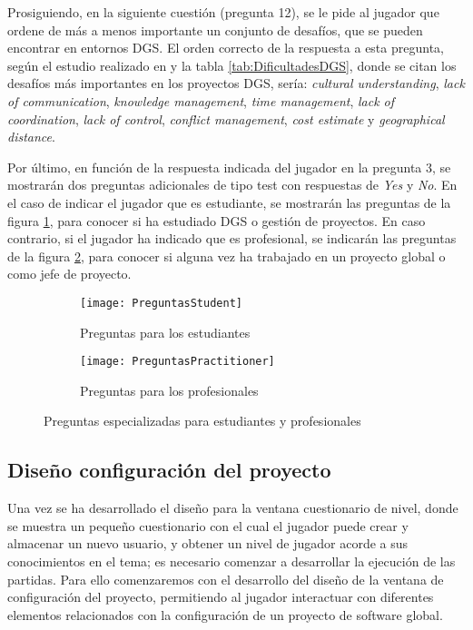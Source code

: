 Prosiguiendo, en la siguiente cuestión (pregunta 12), se le pide al jugador que ordene de más a menos importante un conjunto de desafíos, que se pueden encontrar en entornos DGS. El orden correcto de la respuesta a esta pregunta, según el estudio realizado en \cite{niazi2016challenges} y la tabla \ref{tab:DificultadesDGS}, donde se citan los desafíos más importantes en los proyectos DGS, sería: \emph{cultural understanding}, \emph{lack of communication}, \emph{knowledge management}, \emph{time management}, \emph{lack of coordination}, \emph{lack of control}, \emph{conflict management}, \emph{cost estimate} y \emph{geographical distance}.

Por último, en función de la respuesta indicada del jugador en la pregunta 3, se mostrarán dos preguntas adicionales de tipo test con respuestas de \emph{Yes} y \emph{No}. En el caso de indicar el jugador que es estudiante, se mostrarán las preguntas de la figura \ref{fig:PreguntasStudent}, para conocer si ha estudiado DGS o gestión de proyectos. En caso contrario, si el jugador ha indicado que es profesional, se indicarán las preguntas de la figura \ref{fig:PreguntasPractitioner}, para conocer si alguna vez ha trabajado en un proyecto global o como jefe de proyecto.

\begin{figure}[htb]
	\centering
	\begin{subfigure}[b]{1\linewidth}
		\centering
		\texttt{[image: PreguntasStudent]}
		\caption{Preguntas para los estudiantes}\label{fig:PreguntasStudent}
	\end{subfigure}
	\begin{subfigure}[b]{1\linewidth}
		\centering
		\texttt{[image: PreguntasPractitioner]}
		\caption{Preguntas para los profesionales}\label{fig:PreguntasPractitioner}
	\end{subfigure}
	\caption[Preguntas especializadas para estudiantes y profesionales]{Preguntas especializadas para estudiantes y profesionales}
	\label{fig:PreguntasAdicionales}
\end{figure}

\subsection{Diseño configuración del proyecto}
\label{sec:DiseñoConfiguracionProyecto}

Una vez se ha desarrollado el diseño para la ventana cuestionario de nivel, donde se muestra un pequeño cuestionario con el cual el jugador puede crear y almacenar un nuevo usuario, y obtener un nivel de jugador acorde a sus conocimientos en el tema; es necesario comenzar a desarrollar la ejecución de las partidas. Para ello comenzaremos con el desarrollo del diseño de la ventana de configuración del proyecto, permitiendo al jugador interactuar con diferentes elementos relacionados con la configuración de un proyecto de software global.

